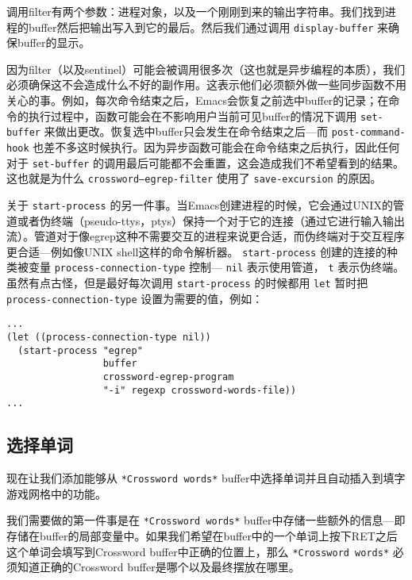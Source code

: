 调用filter有两个参数：进程对象，以及一个刚刚到来的输出字符串。我们找到进程的buffer然后把输出写入到它的最后。然后我们通过调用 \texttt{display-buffer} 来确保buffer的显示。

因为filter（以及sentinel）可能会被调用很多次（这也就是异步编程的本质），我们必须确保这不会造成什么不好的副作用。这表示他们必须额外做一些同步函数不用关心的事。例如，每次命令结束之后，Emacs会恢复之前选中buffer的记录；在命令的执行过程中，函数可能会在不影响用户当前可见buffer的情况下调用 \texttt{set-buffer} 来做出更改。恢复选中buffer只会发生在命令结束之后---而 \texttt{post-command-hook} 也差不多这时候执行。因为异步函数可能会在命令结束之后执行，因此任何对于 \texttt{set-buffer} 的调用最后可能都不会重置，这会造成我们不希望看到的结果。这也就是为什么 \texttt{crossword--egrep-filter} 使用了 \texttt{save-excursion} 的原因。

关于 \texttt{start-process} 的另一件事。当Emacs创建进程的时候，它会通过UNIX的管道或者伪终端（pseudo-ttys，ptys）保持一个对于它的连接（通过它进行输入输出流）。管道对于像egrep这种不需要交互的进程来说更合适，而伪终端对于交互程序更合适---例如像UNIX shell这样的命令解析器。 \texttt{start-process} 创建的连接的种类被变量 \texttt{process-connection-type} 控制--- \texttt{nil} 表示使用管道， \texttt{t} 表示伪终端。虽然有点古怪，但是最好每次调用 \texttt{start-process} 的时候都用 \texttt{let} 暂时把 \texttt{process-connection-type} 设置为需要的值，例如：

\begin{verbatim}
...
(let ((process-connection-type nil))
  (start-process "egrep"
                 buffer
                 crossword-egrep-program
                 "-i" regexp crossword-words-file))
...
\end{verbatim}

\subsection{选择单词}
\label{section:10-Choosing-Words}

现在让我们添加能够从 \texttt{*Crossword words*} buffer中选择单词并且自动插入到填字游戏网格中的功能。

我们需要做的第一件事是在 \texttt{*Crossword words*} buffer中存储一些额外的信息---即存储在buffer的局部变量中。如果我们希望在buffer中的一个单词上按下RET之后这个单词会填写到Crossword buffer中正确的位置上，那么 \texttt{*Crossword words*} 必须知道正确的Crossword buffer是哪个以及最终摆放在哪里。

